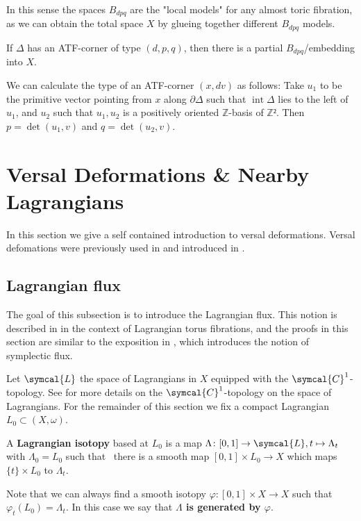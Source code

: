 \documentclass[12pt,a4paper,abstract=true,final]{scrartcl}
\DeclareMathOperator{\interior}{int}
\begin{document}
In this sense the spaces $B_{dpq}$ are the "local models" for any almost toric fibration, as we can obtain the total space $X$ by glueing together different $B_{dpq}$ models.

\begin{lemma}
  \label{thm:atf_bdpq}
  If $Δ$ has an ATF-corner of type $(d,p,q)$, then there is a partial $B_{dpq}$\-/embedding into $X$.
\end{lemma}

\begin{remark}
  \label{rem:atf_corner_type_calc}
  We can calculate the type of an ATF-corner $(x,dv)$ as follows: Take $u_1$ to be the primitive vector pointing from $x$ along $∂Δ$ such that $\interior{Δ}$ lies to the left of $u_1$, and $u_2$ such that $u_1,u_2$ is a positively oriented $ℤ$-basis of $ℤ²$.
Then $p=\det(u_1,v)$ and $q = \det(u_2,v)$.
\end{remark}

\section{Versal Deformations \& Nearby Lagrangians}
\label{sec:vds}

In this section we give a self contained introduction to versal deformations.
Versal defomations were previously used in \cite{brendel2020real,brendel2023local,CheSch10} and introduced in \cite{Che96}.

\subsection{Lagrangian flux}
\label{sec:lagflux}

The goal of this subsection is to introduce the Lagrangian flux.
This notion is described in \cite[Section 2.4]{evans2021atfs} in the context of Lagrangian torus fibrations, and the proofs in this section are similar to the exposition in \cite[Section 10.2]{McDuffSalamonSympTop}, which introduces the notion of symplectic flux.

Let $\symcal{L}$ the space of Lagrangians in $X$ equipped with the $\symcal{C}^1$-topology.
See \cite{ono2008LagrangianFlux} for more details on the $\symcal{C}^1$-topology on the space of Lagrangians. 
For the remainder of this section we fix a compact Lagrangian $L_0 ⊂ (X,ω)$.

\begin{definition}
  A \textbf{Lagrangian isotopy} based at $L_0$ is a map $\Lambda \colon [0,1] \rightarrow \symcal{L}, t \mapsto \Lambda_t$ with $\Lambda_0 = L_0$ such that \ there is a smooth map $[0,1] \times L_0 \rightarrow X$ which maps $\{t\} \times L_0$ to $\Lambda_t$.

  Note that we can always find a smooth isotopy $φ \colon [0,1] × X → X$ such that\ $φ_t(L_0) = Λ_t$.
  In this case we say that \textbf{$Λ$ is generated by $φ$}.
\end{definition}
\end{document}

